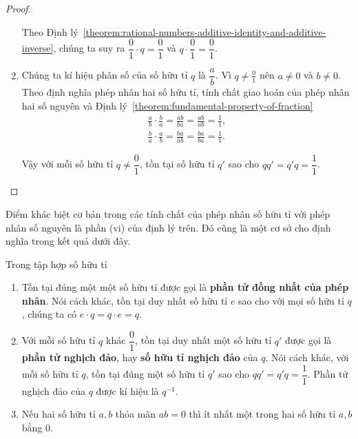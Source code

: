 \begin{proof}
\begin{enumerate}[label={(\roman*)}]
              Theo Định lý~\ref{theorem:rational-numbers-additive-identity-and-additive-inverse}, chúng ta suy ra $\dfrac{0}{1}\cdot q = \dfrac{0}{1}$ và $q\cdot\dfrac{0}{1} = \dfrac{0}{1}$.
        \item Chúng ta kí hiệu phân số của số hữu tỉ $q$ là $\dfrac{a}{b}$. Vì $q\ne \frac{0}{1}$ nên $a\ne 0$ và $b\ne 0$. Theo định nghĩa phép nhân hai số hữu tỉ, tính chất giao hoán của phép nhân hai số nguyên và Định lý~\ref{theorem:fundamental-property-of-fraction}
              \[
                  \begin{split}
                      \frac{a}{b}\cdot\frac{b}{a} = \frac{ab}{ba} = \frac{ab}{ab} = \frac{1}{1}, \\
                      \frac{b}{a}\cdot\frac{a}{b} = \frac{ba}{ab} = \frac{ba}{ba} = \frac{1}{1}.
                  \end{split}
              \]

              Vậy với mỗi số hữu tỉ $q\ne \dfrac{0}{1}$, tồn tại số hữu tỉ $q'$ sao cho $qq' = q'q = \dfrac{1}{1}$.
    \end{enumerate}
\end{proof}

Điểm khác biệt cơ bản trong các tính chất của phép nhân số hữu tỉ với phép nhân số nguyên là phần (vi) của định lý trên. Đó cũng là một cơ sở cho định nghĩa trong kết quả dưới đây.
\begin{theorem}\label{theorem:rational-numbers-multiplicative-identity-multiplicative-inverse}
    Trong tập hợp số hữu tỉ
    \begin{enumerate}[label={(\roman*)}]
        \item Tồn tại đúng một một số hữu tỉ được gọi là \textbf{phần tử đồng nhất của phép nhân}. Nói cách khác, tồn tại duy nhất số hữu tỉ $e$ sao cho với mọi số hữu tỉ $q$, chúng ta có $e\cdot q = q\cdot e = q$.
        \item Với mỗi số hữu tỉ $q$ khác $\dfrac{0}{1}$, tồn tại duy nhất một số hữu tỉ $q'$ được gọi là \textbf{phần tử nghịch đảo}, hay \textbf{số hữu tỉ nghịch đảo} của $q$. Nói cách khác, với mỗi số hữu tỉ $q$, tồn tại đúng một số hữu tỉ $q'$ sao cho $qq' = q'q = \dfrac{1}{1}$. Phần tử nghịch đảo của $q$ được kí hiệu là $q^{-1}$.
        \item Nếu hai số hữu tỉ $a, b$ thỏa mãn $ab = 0$ thì ít nhất một trong hai số hữu tỉ $a, b$ bằng $0$.
    \end{enumerate}
\end{theorem}

